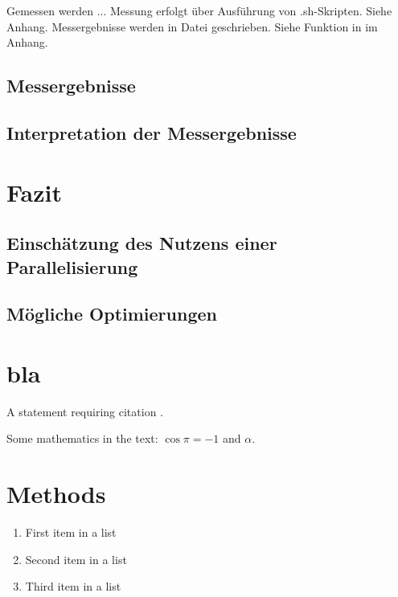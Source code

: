 \documentclass[
10pt, %
a4paper, %
oneside, %
headinclude,footinclude, %
BCOR5mm, %
]{scrartcl}
\begin{document}
Gemessen werden ...
Messung erfolgt über Ausführung von .sh-Skripten. Siehe Anhang.
Messergebnisse werden in Datei geschrieben. Siehe Funktion in im Anhang.

\subsection{Messergebnisse}



\subsection{Interpretation der Messergebnisse}

\section{Fazit}


\subsection{Einschätzung des Nutzens einer Parallelisierung}


\subsection{Mögliche Optimierungen}

\section{bla}

A statement requiring citation \cite{Figueredo:2009dg}.

\lipsum[1-3] %

Some mathematics in the text: $\cos\pi=-1$ and $\alpha$.
 

\section{Methods}

\lipsum[5] %

\begin{enumerate}[noitemsep] %
\item First item in a list
\item Second item in a list
\item Third item in a list
\end{enumerate}
\end{document}
